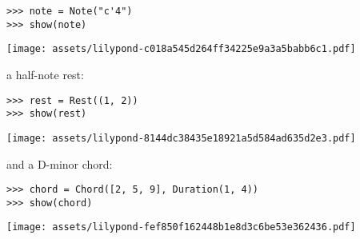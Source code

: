 \begin{comment}
<abjad>
note = Note("c'4")
show(note)
</abjad>
\end{comment}

\begin{abjadbookoutput}
\begin{singlespacing}
\vspace{-0.5\baselineskip}
\begin{lstlisting}
>>> note = Note("c'4")
>>> show(note)
\end{lstlisting}
\noindent\texttt{[image: assets/lilypond-c018a545d264ff34225e9a3a5babb6c1.pdf]}
\end{singlespacing}
\end{abjadbookoutput}

\noindent a half-note rest:

\begin{comment}
<abjad>
rest = Rest((1, 2))
show(rest)
</abjad>
\end{comment}

\begin{abjadbookoutput}
\begin{singlespacing}
\vspace{-0.5\baselineskip}
\begin{lstlisting}
>>> rest = Rest((1, 2))
>>> show(rest)
\end{lstlisting}
\noindent\texttt{[image: assets/lilypond-8144dc38435e18921a5d584ad635d2e3.pdf]}
\end{singlespacing}
\end{abjadbookoutput}

\noindent and a D-minor chord:

\begin{comment}
<abjad>
chord = Chord([2, 5, 9], Duration(1, 4))
show(chord)
</abjad>
\end{comment}

\begin{abjadbookoutput}
\begin{singlespacing}
\vspace{-0.5\baselineskip}
\begin{lstlisting}
>>> chord = Chord([2, 5, 9], Duration(1, 4))
>>> show(chord)
\end{lstlisting}
\noindent\texttt{[image: assets/lilypond-fef850f162448b1e8d3c6be53e362436.pdf]}
\end{singlespacing}
\end{abjadbookoutput}

